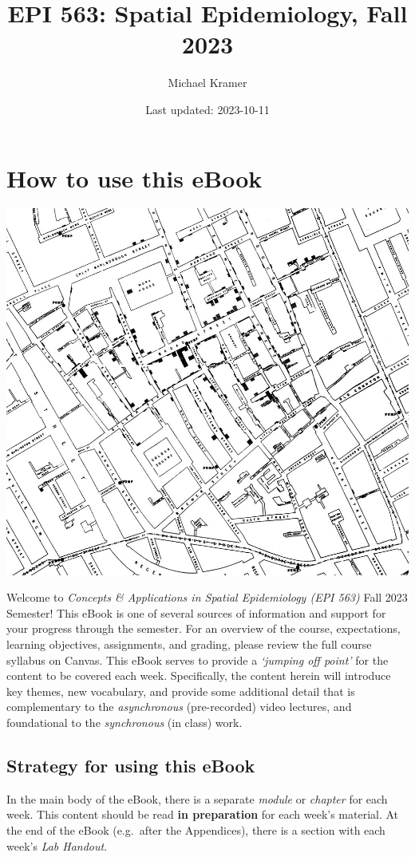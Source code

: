 \documentclass[
]{book}
\title{EPI 563: Spatial Epidemiology, Fall 2023}
\author{Michael Kramer}
\date{Last updated: 2023-10-11}
\begin{document}
\maketitle

{
\setcounter{tocdepth}{2}
\tableofcontents
}
\hypertarget{how-to-use-this-ebook}{%
\chapter*{How to use this eBook}\label{how-to-use-this-ebook}}

\begin{center}\includegraphics[width=0.5\linewidth]{images/John-Snows-cholera-map-of-009} \end{center}

Welcome to \emph{Concepts \& Applications in Spatial Epidemiology (EPI 563)} Fall 2023 Semester! This eBook is one of several sources of information and support for your progress through the semester. For an overview of the course, expectations, learning objectives, assignments, and grading, please review the full course syllabus on Canvas. This eBook serves to provide a \emph{`jumping off point'} for the content to be covered each week. Specifically, the content herein will introduce key themes, new vocabulary, and provide some additional detail that is complementary to the \emph{asynchronous} (pre-recorded) video lectures, and foundational to the \emph{synchronous} (in class) work.

\hypertarget{strategy-for-using-this-ebook}{%
\section*{Strategy for using this eBook}\label{strategy-for-using-this-ebook}}

In the main body of the eBook, there is a separate \emph{module} or \emph{chapter} for each week. This content should be read \textbf{in preparation} for each week's material. At the end of the eBook (e.g.~after the Appendices), there is a section with each week's \emph{Lab Handout}.
\end{document}

